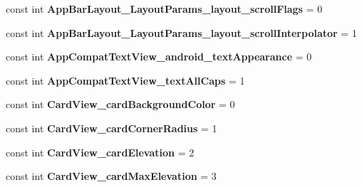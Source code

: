 \begin{DoxyCompactItemize}
\item 
\hypertarget{classClient_1_1Droid_1_1Resource_1_1Styleable_a3f529f8714e26472abbb3a4380f62b07}{}const int {\bfseries App\+Bar\+Layout\+\_\+\+Layout\+Params\+\_\+layout\+\_\+scroll\+Flags} = 0\label{classClient_1_1Droid_1_1Resource_1_1Styleable_a3f529f8714e26472abbb3a4380f62b07}

\item 
\hypertarget{classClient_1_1Droid_1_1Resource_1_1Styleable_afe35035bea6c51debaa1b2ed4104873a}{}const int {\bfseries App\+Bar\+Layout\+\_\+\+Layout\+Params\+\_\+layout\+\_\+scroll\+Interpolator} = 1\label{classClient_1_1Droid_1_1Resource_1_1Styleable_afe35035bea6c51debaa1b2ed4104873a}

\item 
\hypertarget{classClient_1_1Droid_1_1Resource_1_1Styleable_a22488cbf57270b8c19a0401a702b9768}{}const int {\bfseries App\+Compat\+Text\+View\+\_\+android\+\_\+text\+Appearance} = 0\label{classClient_1_1Droid_1_1Resource_1_1Styleable_a22488cbf57270b8c19a0401a702b9768}

\item 
\hypertarget{classClient_1_1Droid_1_1Resource_1_1Styleable_ab55bb27fa325244e45b6b28a8dcdb9d3}{}const int {\bfseries App\+Compat\+Text\+View\+\_\+text\+All\+Caps} = 1\label{classClient_1_1Droid_1_1Resource_1_1Styleable_ab55bb27fa325244e45b6b28a8dcdb9d3}

\item 
\hypertarget{classClient_1_1Droid_1_1Resource_1_1Styleable_a50aaf604eb51f638bd744a7a098b6a8b}{}const int {\bfseries Card\+View\+\_\+card\+Background\+Color} = 0\label{classClient_1_1Droid_1_1Resource_1_1Styleable_a50aaf604eb51f638bd744a7a098b6a8b}

\item 
\hypertarget{classClient_1_1Droid_1_1Resource_1_1Styleable_a7ecdfb4e9129320834c464eb6b56ce6d}{}const int {\bfseries Card\+View\+\_\+card\+Corner\+Radius} = 1\label{classClient_1_1Droid_1_1Resource_1_1Styleable_a7ecdfb4e9129320834c464eb6b56ce6d}

\item 
\hypertarget{classClient_1_1Droid_1_1Resource_1_1Styleable_aab57985e0bb6b25fb79c452cf809a47c}{}const int {\bfseries Card\+View\+\_\+card\+Elevation} = 2\label{classClient_1_1Droid_1_1Resource_1_1Styleable_aab57985e0bb6b25fb79c452cf809a47c}

\item 
\hypertarget{classClient_1_1Droid_1_1Resource_1_1Styleable_a48bcb098b12d1066d9628c27b650f5ad}{}const int {\bfseries Card\+View\+\_\+card\+Max\+Elevation} = 3\label{classClient_1_1Droid_1_1Resource_1_1Styleable_a48bcb098b12d1066d9628c27b650f5ad}


\end{DoxyCompactItemize}

